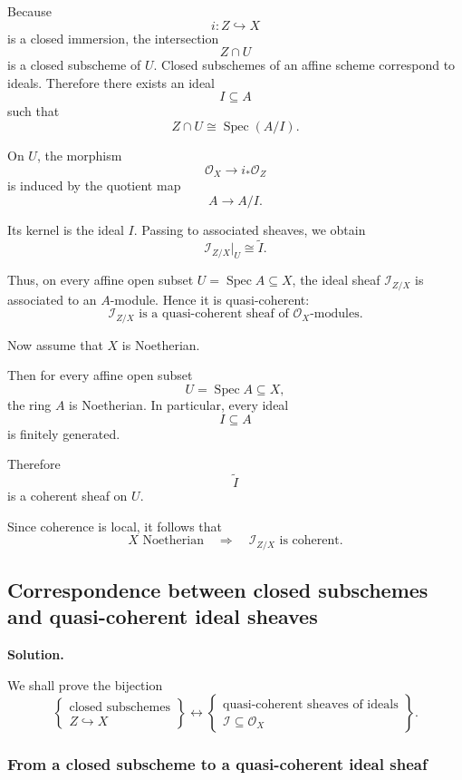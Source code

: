 \documentclass[12pt,a4paper]{article}
\DeclareMathOperator{\Spec}{Spec}
\newcommand{\OO}{\mathcal{O}}
\providecommand{\Spec}{\operatorname{Spec}}
\theoremstyle{notespace}
\begin{document}
Because
\[
i:Z\hookrightarrow X
\]
is a closed immersion, the intersection
\[
Z\cap U
\]
is a closed subscheme of \(U\). Closed subschemes of an affine scheme correspond to ideals. Therefore there exists an ideal
\[
I\subseteq A
\]
such that
\[
Z\cap U\cong \Spec(A/I).
\]

On \(U\), the morphism
\[
\OO_X\longrightarrow i_*\OO_Z
\]
is induced by the quotient map
\[
A\longrightarrow A/I.
\]

Its kernel is the ideal \(I\). Passing to associated sheaves, we obtain
\[
\mathcal{I}_{Z/X}|_U
\cong
\widetilde{I}.
\]

Thus, on every affine open subset \(U=\Spec A\subseteq X\), the ideal sheaf \(\mathcal{I}_{Z/X}\) is associated to an \(A\)-module. Hence it is quasi-coherent:
\[
\boxed{
	\mathcal{I}_{Z/X}
	\text{ is a quasi-coherent sheaf of }\OO_X\text{-modules.}
}
\]

Now assume that \(X\) is Noetherian.

Then for every affine open subset
\[
U=\Spec A\subseteq X,
\]
the ring \(A\) is Noetherian. In particular, every ideal
\[
I\subseteq A
\]
is finitely generated.

Therefore
\[
\widetilde{I}
\]
is a coherent sheaf on \(U\).

Since coherence is local, it follows that
\[
\boxed{
	X\text{ Noetherian}
	\quad\Longrightarrow\quad
	\mathcal{I}_{Z/X}
	\text{ is coherent.}
}
\]

\subsection{Correspondence between closed subschemes and quasi-coherent ideal sheaves}

\textbf{Solution.}

We shall prove the bijection
\[
\boxed{
	\left\{
	\begin{array}{c}
		\text{closed subschemes}\\
		Z\hookrightarrow X
	\end{array}
	\right\}
	\longleftrightarrow
	\left\{
	\begin{array}{c}
		\text{quasi-coherent sheaves of ideals}\\
		\mathcal{I}\subseteq \OO_X
	\end{array}
	\right\}.
}
\]

\subsubsection{From a closed subscheme to a quasi-coherent ideal sheaf}
\end{document}
